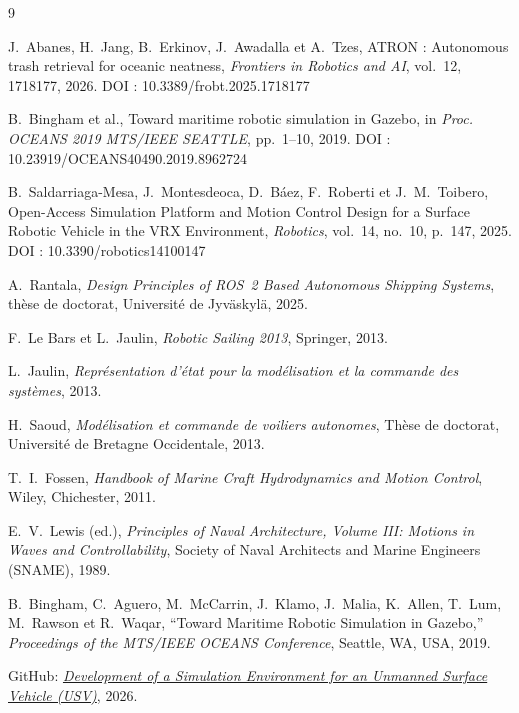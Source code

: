 \documentclass{rapportEILCO}
\begin{document}
	
	\newpage
	\begin{thebibliography}{9}
		
		 J.~Abanes, H.~Jang, B.~Erkinov, J.~Awadalla et A.~Tzes,
		\og ATRON : Autonomous trash retrieval for oceanic neatness\fg,
		\emph{Frontiers in Robotics and AI}, vol.~12, 1718177, 2026.
		DOI : 10.3389/frobt.2025.1718177
		
		 B.~Bingham et al.,
		\og Toward maritime robotic simulation in Gazebo\fg,
		in \emph{Proc. OCEANS 2019 MTS/IEEE SEATTLE}, pp.~1--10, 2019.
		DOI : 10.23919/OCEANS40490.2019.8962724
		
		 B.~Saldarriaga-Mesa, J.~Montesdeoca, D.~Báez, F.~Roberti et J.~M.~Toibero,
		\og Open-Access Simulation Platform and Motion Control Design for a Surface Robotic Vehicle in the VRX Environment\fg,
		\emph{Robotics}, vol.~14, no.~10, p.~147, 2025.
		DOI : 10.3390/robotics14100147
		
		 A.~Rantala,
		\emph{Design Principles of ROS~2 Based Autonomous Shipping Systems},
		thèse de doctorat, Université de Jyväskylä, 2025.
		
		F.~Le Bars et L.~Jaulin,
		\emph{Robotic Sailing 2013},
		Springer, 2013.
		
		L.~Jaulin,
		\emph{Représentation d'état pour la modélisation et la commande des systèmes},
		2013.
		
		H.~Saoud,
		\emph{Modélisation et commande de voiliers autonomes},
		Thèse de doctorat, Université de Bretagne Occidentale, 2013.
		
		T.~I.~Fossen,
		\emph{Handbook of Marine Craft Hydrodynamics and Motion Control},
		Wiley, Chichester, 2011.
		
		E.~V.~Lewis (ed.),
		\emph{Principles of Naval Architecture, Volume III:
			Motions in Waves and Controllability},
		Society of Naval Architects and Marine Engineers (SNAME),
		1989.
		
		B.~Bingham, C.~Aguero, M.~McCarrin, J.~Klamo, J.~Malia,
		K.~Allen, T.~Lum, M.~Rawson et R.~Waqar,
		``Toward Maritime Robotic Simulation in Gazebo,''
		\emph{Proceedings of the MTS/IEEE OCEANS Conference},
		Seattle, WA, USA, 2019.
		
		 GitHub: \href{https://github.com/oussamaissm/Development-of-a-Simulation-Environment-for-an-Unmanned-Surface-Vehicle-USV-}{\emph{Development of a Simulation Environment for an Unmanned Surface Vehicle (USV)}}, 2026.
		
	\end{thebibliography}
	
\end{document}
